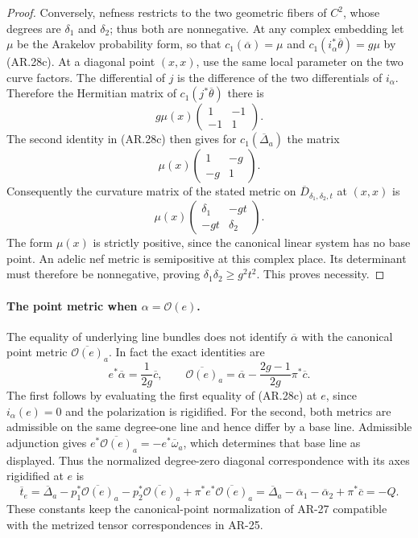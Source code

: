 \begin{proof}
Conversely, nefness restricts to the two geometric fibers of
$C^2$, whose degrees are $\delta_1$ and $\delta_2$; thus both
are nonnegative.  At any complex embedding let $\mu$ be the
Arakelov probability form, so that
$c_1(\overline\alpha)=\mu$ and
$c_1(i_\alpha^*\overline\theta)=g\mu$ by (AR.28c).
At a diagonal point $(x,x)$, use the same local parameter on the
two curve factors.  The differential of $j$ is the difference of
the two differentials of $i_\alpha$.  Therefore the Hermitian
matrix of $c_1(j^*\overline\theta)$ there is
\[
 g\mu(x)\begin{pmatrix}1&-1\\-1&1\end{pmatrix}.
\]
The second identity in (AR.28c) then gives for
$c_1(\overline\Delta_a)$ the matrix
\[
 \mu(x)\begin{pmatrix}1&-g\\-g&1\end{pmatrix}.
\]
Consequently the curvature matrix of the stated metric on
$\overline D_{\delta_1,\delta_2,t}$ at $(x,x)$ is
\[
 \mu(x)\begin{pmatrix}\delta_1&-gt\\-gt&\delta_2\end{pmatrix}.
                                                               \tag{AR.28d}
\]
The form $\mu(x)$ is strictly positive, since the canonical
linear system has no base point.  An adelic nef metric is
semipositive at this complex place.  Its determinant must
therefore be nonnegative, proving
$\delta_1\delta_2\ge g^2t^2$.  This proves necessity.
\end{proof}

\paragraph{The point metric when $\alpha=\mathcal O(e)$.}
The equality of underlying line bundles does not identify
$\overline\alpha$ with the canonical point metric
$\overline{\mathcal O(e)}_a$.  In fact the exact identities are
\[
 e^*\overline\alpha=\frac1{2g}\overline c,
 \qquad
 \overline{\mathcal O(e)}_a
      =\overline\alpha-\frac{2g-1}{2g}\pi^*\overline c.
                                                               \tag{AR.28f}
\]
The first follows by evaluating the first equality of (AR.28c)
at $e$, since $i_\alpha(e)=0$ and the polarization is rigidified.
For the second, both metrics are admissible on the same degree-one
line and hence differ by a base line.  Admissible adjunction gives
$e^*\overline{\mathcal O(e)}_a=-e^*\overline\omega_a$,
which determines that base line as displayed.  Thus the normalized
degree-zero diagonal correspondence with its axes rigidified at
$e$ is
\[
 \overline t_e
 =\overline\Delta_a-p_1^*\overline{\mathcal O(e)}_a
                    -p_2^*\overline{\mathcal O(e)}_a
                    +\pi^*e^*\overline{\mathcal O(e)}_a
 =\overline\Delta_a-\overline\alpha_1-\overline\alpha_2
                    +\pi^*\overline c=-Q.
\]
These constants keep the canonical-point normalization of AR-27
compatible with the metrized tensor correspondences in AR-25.

